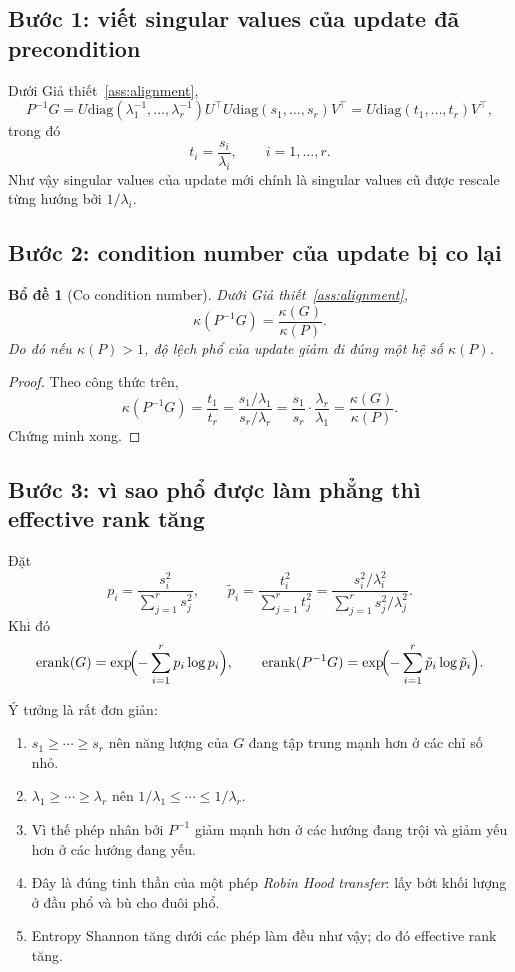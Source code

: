 \documentclass[11pt,a4paper]{article}
\newtheorem{lemma}{Bổ đề}
\newcommand{\erank}{\mathrm{erank}}
\newcommand{\diag}{\mathrm{diag}}
\begin{document}
\subsection*{Bước 1: viết singular values của update đã precondition}
Dưới Giả thiết~\ref{ass:alignment},
\[
P^{-1}G
=
U\diag(\lambda_1^{-1},\dots,\lambda_r^{-1})U^\top U\diag(s_1,\dots,s_r)V^\top
=
U\diag(t_1,\dots,t_r)V^\top,
\]
trong đó
\[
t_i = \frac{s_i}{\lambda_i},\qquad i=1,\dots,r.
\]
Như vậy singular values của update mới chính là singular values cũ được rescale từng hướng bởi $1/\lambda_i$.

\subsection*{Bước 2: condition number của update bị co lại}
\begin{lemma}[Co condition number]
\label{lem:kappa}
Dưới Giả thiết~\ref{ass:alignment},
\[
\kappa(P^{-1}G)=\frac{\kappa(G)}{\kappa(P)}.
\]
Do đó nếu $\kappa(P)>1$, độ lệch phổ của update giảm đi đúng một hệ số $\kappa(P)$.
\end{lemma}

\begin{proof}
Theo công thức trên,
\[
\kappa(P^{-1}G)=\frac{t_1}{t_r}
=
\frac{s_1/\lambda_1}{s_r/\lambda_r}
=
\frac{s_1}{s_r}\cdot \frac{\lambda_r}{\lambda_1}
=
\frac{\kappa(G)}{\kappa(P)}.
\]
Chứng minh xong.
\end{proof}

\subsection*{Bước 3: vì sao phổ được làm phẳng thì effective rank tăng}
Đặt
\[
p_i=\frac{s_i^2}{\sum_{j=1}^r s_j^2},
\qquad
\tilde p_i=\frac{t_i^2}{\sum_{j=1}^r t_j^2}
=
\frac{s_i^2/\lambda_i^2}{\sum_{j=1}^r s_j^2/\lambda_j^2}.
\]
Khi đó
\[
\erank(G)=\exp\!\Bigl(-\sum_{i=1}^r p_i\log p_i\Bigr),
\qquad
\erank(P^{-1}G)=\exp\!\Bigl(-\sum_{i=1}^r \tilde p_i\log \tilde p_i\Bigr).
\]

\noindent
Ý tưởng là rất đơn giản:
\begin{enumerate}[nosep]
    \item $s_1\ge \cdots\ge s_r$ nên năng lượng của $G$ đang tập trung mạnh hơn ở các chỉ số nhỏ.
    \item $\lambda_1\ge \cdots\ge \lambda_r$ nên $1/\lambda_1\le \cdots\le 1/\lambda_r$.
    \item Vì thế phép nhân bởi $P^{-1}$ giảm mạnh hơn ở các hướng đang trội và giảm yếu hơn ở các hướng đang yếu.
    \item Đây là đúng tinh thần của một phép \emph{Robin Hood transfer}: lấy bớt khối lượng ở đầu phổ và bù cho đuôi phổ.
    \item Entropy Shannon tăng dưới các phép làm đều như vậy; do đó effective rank tăng.
\end{enumerate}
\end{document}
